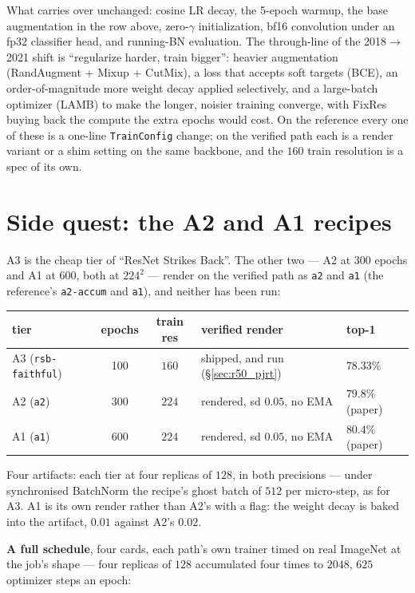 \noindent What carries over unchanged: cosine LR decay, the 5-epoch
warmup, the base augmentation in the row above, zero-$\gamma$
initialization, bf16 convolution under an fp32 classifier head, and
running-BN evaluation. The through-line
of the 2018$\to$2021 shift is ``regularize harder, train bigger'':
heavier augmentation (RandAugment + Mixup + CutMix), a loss that accepts
soft targets (BCE), an order-of-magnitude more weight decay applied
selectively, and a large-batch optimizer (LAMB) to make the longer,
noisier training converge, with FixRes buying back the compute the
extra epochs would cost. On the reference every one of these is a
one-line \texttt{TrainConfig} change; on the verified path each is a render
variant or a shim setting on the same backbone, and the $160$ train
resolution is a spec of its own.

\section{Side quest: the A2 and A1 recipes}
\label{sec:r50_a2_a1_cost}

A3 is the cheap tier of ``ResNet Strikes Back''. The other two --- A2 at
300 epochs and A1 at 600, both at $224^2$ --- render on the verified path
as \texttt{a2} and \texttt{a1} (the reference's \texttt{a2-accum} and
\texttt{a1}), and neither has been run:

\begin{center}
\begin{tabular}{@{}l c c l l@{}}
\hline
tier & epochs & train res & verified render & top-1 \\
\hline
A3 (\texttt{rsb-faithful}) & 100 & $160$ & shipped, and run (\S\ref{sec:r50_pjrt}) & $\mathbf{78.33\%}$ \\
A2 (\texttt{a2})           & 300 & $224$ & rendered, sd $0.05$, no EMA & $79.8\%$ (paper) \\
A1 (\texttt{a1})           & 600 & $224$ & rendered, sd $0.05$, no EMA & $80.4\%$ (paper) \\
\hline
\end{tabular}
\end{center}

\noindent Four artifacts: each tier at four replicas of $128$, in both
precisions --- under synchronised BatchNorm the recipe's
ghost batch of $512$ per micro-step, as for A3. A1 is its own render rather
than A2's with a flag: the weight decay is baked into the artifact, $0.01$
against A2's $0.02$.

\medskip\noindent \textbf{A full schedule}, four cards, each path's own
trainer timed on real ImageNet at the job's shape --- four replicas of $128$
accumulated four times to $2048$, $625$ optimizer steps an epoch:

